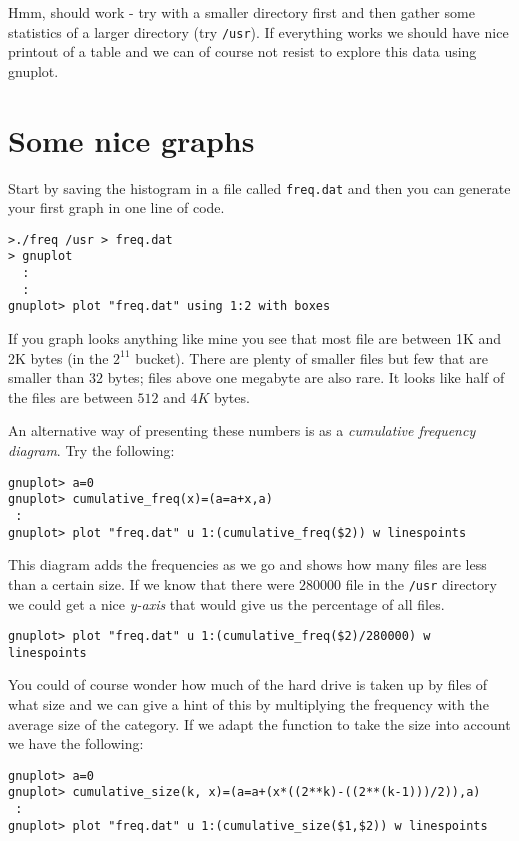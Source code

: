\documentclass[a4paper,11pt]{article}
\begin{document}
Hmm, should work - try with a smaller directory first and then gather
some statistics of a larger directory (try {\tt /usr}). If everything
works we should have nice printout of a table and we can of course not
resist to explore this data using gnuplot.

\section{Some nice graphs}

Start by saving the histogram in a file called {\tt freq.dat} and then
you can generate your first graph in one line of code.

\begin{verbatim}
>./freq /usr > freq.dat
> gnuplot
  :
  :
gnuplot> plot "freq.dat" using 1:2 with boxes
\end{verbatim}

If you graph looks anything like mine you see that most file are
between 1K and 2K bytes (in the $2^{11}$ bucket). There are plenty of
smaller files but few that are smaller than $32$ bytes; files above
one megabyte are also rare. It looks like half of the files are
between $512$ and $4K$ bytes.

An alternative way of presenting these numbers is as a {\em cumulative
  frequency diagram}. Try the following:

\begin{verbatim}
gnuplot> a=0
gnuplot> cumulative_freq(x)=(a=a+x,a)
 :
gnuplot> plot "freq.dat" u 1:(cumulative_freq($2)) w linespoints
\end{verbatim}

This diagram adds the frequencies as we go and shows how many files are
less than a certain size. If we know that there were $280000$
file in the {\tt /usr} directory we could get a nice {\em y-axis} that
would give us the percentage of all files.

\begin{verbatim}
gnuplot> plot "freq.dat" u 1:(cumulative_freq($2)/280000) w linespoints
\end{verbatim}

You could of course wonder how much of the hard drive is taken up by
files of what size and we can give a hint of this by multiplying the
frequency with the average size of the category. If we adapt the
function to take the size into account we have the following:

\begin{verbatim}
gnuplot> a=0
gnuplot> cumulative_size(k, x)=(a=a+(x*((2**k)-((2**(k-1)))/2)),a)
 :
gnuplot> plot "freq.dat" u 1:(cumulative_size($1,$2)) w linespoints
\end{verbatim}
\end{document}
